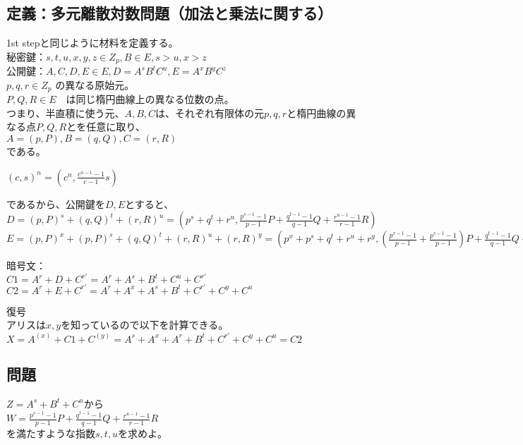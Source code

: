 \documentclass[
]{article}
\begin{document}
\hypertarget{ux5b9aux7fa9ux591aux5143ux96e2ux6563ux5bfeux6570ux554fux984cux52a0ux6cd5ux3068ux4e57ux6cd5ux306bux95a2ux3059ux308b}{%
\subsection{定義：多元離散対数問題（加法と乗法に関する）}\label{ux5b9aux7fa9ux591aux5143ux96e2ux6563ux5bfeux6570ux554fux984cux52a0ux6cd5ux3068ux4e57ux6cd5ux306bux95a2ux3059ux308b}}

1st stepと同じように材料を定義する。\\
秘密鍵：\(s,t,u,x,y,z \in Z_p,B \in E,s > u, x > z\)\\
公開鍵：\(A,C,D,E \in E,D=A^sB^tC^u,E=A^xB^yC^z\)\\
\(p,q,r \in Z_p\) の異なる原始元。\\
\(P,Q,R \in E\)　は同じ楕円曲線上の異なる位数の点。\\
つまり、半直積に使う元、\(A,B,C\)は、それぞれ有限体の元\(p,q,r\)と楕円曲線の異なる点\(P,Q,R\)とを任意に取り、\\
\(A=(p,P),B=(q,Q),C=(r,R)\)\\
である。

\((c,s)^n=(c^n,\frac{c^{n-1}-1}{c-1}s)\)

であるから、公開鍵を\(D,E\)とすると、\\
\(D=(p,P)^s+(q,Q)^t+(r,R)^u=(p^s+q^t+r^u,\frac{p^{s-1}-1}{p-1}P+\frac{q^{t-1}-1}{q-1}Q+\frac{r^{u-1}-1}{r-1}R)\)\\
\(E=(p,P)^x+(p,P)^s+(q,Q)^t+(r,R)^u+(r,R)^y=(p^x+p^{s}+q^t+r^{u}+r^y,(\frac{p^{x-1}-1}{p-1}+\frac{p^{s-1}-1}{p-1})P+\frac{q^{t-1}-1}{q-1}Q+(\frac{q^{y-1}-1}{q-1}+\frac{r^{u-1}-1}{r-1})R)\)

暗号文：\\
\(C1=A^r+D+C^{r'}=A^{r}+A^s+B^t+C^u+C^{r'}\)\\
\(C2=A^{r}+E+C^{r'}=A^r+A^x+A^s+B^t+C^{r'}+C^y+C^u\)

復号\\
アリスは\(x,y\)を知っているので以下を計算できる。\\
\(X=A^{(x)}+C1+C^{(y)}=A^{s}+A^x+A^r+B^t+C^{r'}+C^y+C^u=C2\)

\hypertarget{ux554fux984c}{%
\subsection{問題}\label{ux554fux984c}}

\(Z=A^s+B^t+C^u\)から\\
\(W=\frac{p^{s-1}-1}{p-1}P+\frac{q^{t-1}-1}{q-1}Q+\frac{r^{u-1}-1}{r-1}R\)\\
を満たすような指数\(s,t,u\)を求めよ。
\end{document}
